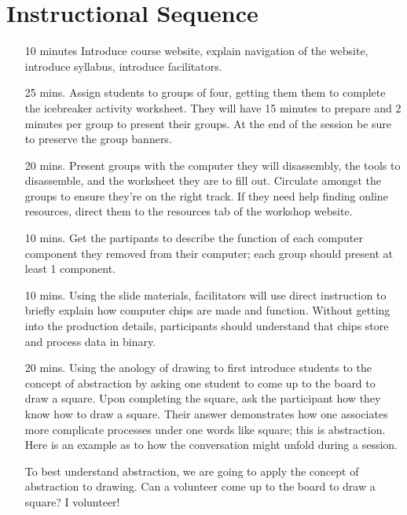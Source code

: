 \documentclass[12pt]{article}
\begin{document}
  \section*{Instructional Sequence}
  \begin{itemize}
    \item[10 minutes] Introduce course website, explain navigation of the
      website, introduce syllabus, introduce facilitators.
    \item[25 mins.] Assign students to groups of four, getting them them to complete the icebreaker activity worksheet. They will have 15 minutes to prepare and 2
      minutes per group to present their groups. At the end of the session be
      sure to preserve the group banners.
    \item[20 mins.] Present groups with the computer they will disassembly,
      the tools to disassemble, and the worksheet they are to fill out.
      Circulate amongst the groups to ensure they're on the right track. If
      they need help finding online resources, direct them to the resources tab of the
      workshop website. 
    \item[10 mins.] Get the partipants to describe the function of each
      computer component they removed from their computer; each group should
      present at least 1 component.
    \item[10 mins.] Using the slide materials, facilitators will use direct
      instruction to briefly explain how computer chips are made and function.
      Without getting into the production details, participants should
      understand that chips store and process data in binary.
    \item[20 mins.] Using the anology of drawing to first introduce students to
      the concept of abstraction by asking one student to come up to the board to
      draw a square. Upon completing the square, ask the participant how they
      know how to draw a square. Their answer demonstrates how one associates more complicate processes under one words
      like square; this is abstraction. Here is an example as to how the
      conversation might unfold during a session.
      \begin{dialogue}
         To best understand abstraction, we are going to
        apply the concept of abstraction to drawing. Can a volunteer come up to
        the board to draw a square?
         I volunteer!



\end{dialogue}
\end{itemize}
\end{document}
